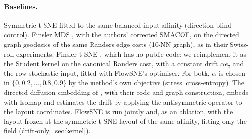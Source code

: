 \paragraph{Baselines.}
Symmetric t-SNE fitted to the same balanced input affinity (direction-blind
control). Finsler MDS \citep{dages2025finsler}, with the authors' corrected
SMACOF, on the directed graph geodesics of the same Randers edge costs
(10-NN graph), as in their Swiss-roll experiments. Finsler t-SNE
\citep{dages2026harnessing}, which has no public code: we reimplement it as
the Student kernel on the canonical Randers cost, with a constant drift
$\alpha e_2$ and the row-stochastic input, fitted with FlowSNE's optimiser.
For both, $\alpha$ is chosen in $\{0,0.2,\dots,0.8,0.9\}$ by the method's
own objective (stress, cross-entropy). The directed diffusion embedding of
\citet{debaussart2026finslerian}, with their code and graph construction,
embeds with Isomap and estimates the drift by applying the antisymmetric
operator to the layout coordinates. FlowSNE is run jointly and, as an
ablation, with the layout frozen at the symmetric t-SNE layout of the same
affinity, fitting only the field (drift-only, \cref{sec:kernel}).

